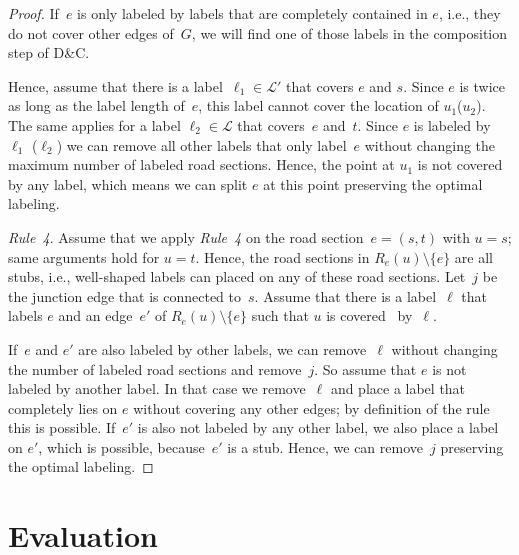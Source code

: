 \documentclass[a4paper,11pt]{article}
\newcommand{\RuleD}{\textit{Rule~4}\xspace}
\newcommand{\Shredder}{\textsc{D\&C}}
\begin{document}
\begin{proof}
  If~$e$ is only labeled by labels that are completely
  contained in $e$, i.e., they do not cover other edges of~$G$, we
  will find one of those labels in the composition step of \Shredder.

  Hence, assume that there is a label~$\ell_1 \in \mathcal L'$ that
  covers $e$ and $s$. Since $e$ is twice as long as the label length
  of~$e$, this label cannot cover the location of $u_1$($u_2$). The
  same applies for a label $\ell_2\in \mathcal L$ that covers~$e$
  and~$t$. Since $e$ is labeled by $\ell_1$ ($\ell_2$) we can remove
  all other labels that only label~$e$ without changing the maximum
  number of labeled road sections. Hence, the point at $u_1$ is not
  covered by any label, which means we can split $e$ at this
  point preserving the optimal labeling.

  \RuleD. Assume that we apply \RuleD on the road section~$e=(s,t)$
  with $u=s$; same arguments hold for $u=t$. Hence, the road sections
  in $R_e(u)\setminus\{e\}$ are all stubs, i.e., well-shaped labels can placed
  on any of these road sections. Let~$j$ be the junction edge that is
  connected to~$s$. Assume that there is a label~$\ell$ that labels
  $e$ and an edge~$e'$ of $R_e(u)\setminus\{e\}$ such that $u$ is covered~ by~$\ell$.

  If~$e$ and $e'$ are also labeled by other labels, we can
  remove~$\ell$ without changing the number of labeled road sections
  and remove~$j$.  So assume that $e$ is not labeled by another
  label. In that case we remove~$\ell$ and place a label that
  completely lies on $e$ without covering any other edges; by
  definition of the rule this is possible. If~$e'$ is also not labeled
  by any other label, we also place a label on $e'$, which is
  possible, because~$e'$ is a stub. Hence, we can remove~$j$ preserving the optimal labeling. 
\end{proof}



\section{Evaluation}\label{sec:evaluation}
\end{document}
